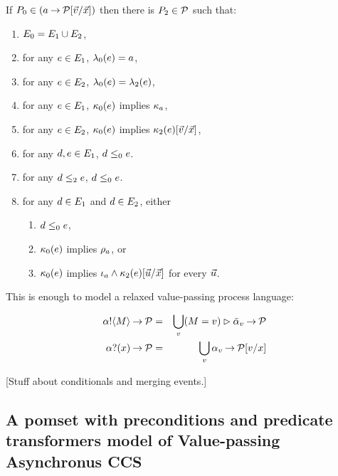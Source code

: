 \begin{definition}
  \label{defn:pomset-wprefix}
  If $P_0 \in (a\mathbin{\rightarrow}\mathcal{P}[\vec{v}/\vec{x}])$ then there is $P_2\in\mathcal{P}$ such that:
  \begin{enumerate}
  \item $E_0=E_1 \cup E_2$,
  \item for any $e\in E_1$, $\lambda_0(e) = a$,
  \item for any $e\in E_2$, $\lambda_0(e) = \lambda_2(e)$,
  \item for any $e\in E_1$, $\kappa_0(e)$ implies $\kappa_a$,
  \item for any $e\in E_2$, $\kappa_0(e)$ implies $\kappa_2(e)[\vec{v}/\vec{x}]$,
  \item for any $d,e\in E_1$, $d\le_0e$.
  \item for any $d\le_2e$, $d\le_0e$.
  \item for any $d\in E_1$ and $d\in E_2$, either
    \begin{enumerate}
    \item $d\le_0e$,
    \item $\kappa_0(e)$ implies $\rho_a$, or
    \item $\kappa_0(e)$ implies $\iota_a\land\kappa_2(e)[\vec{u}/\vec{x}]$ for every $\vec{u}$.
    \end{enumerate}
  \end{enumerate}
\end{definition}

This is enough to model a relaxed value-passing process language:

\begin{eqnarray*}
  \sSEND\aChan\aExp\wPREFIX\aPSS & = &
  \bigcup_\aVal (\aExp=\aVal) \sGUARD \send\aChan{\aVal} \wPREFIX \aPSS
\\
  \sRECV\aChan\aVar\wPREFIX\aPSS & = &
  \bigcup_\aVal \recv\aChan{\aVal} \wPREFIX \aPSS[\aVal/\aVar]
\end{eqnarray*}

[Stuff about conditionals and merging events.]

\subsection{A pomset with preconditions and predicate transformers model of Value-passing Asynchronus CCS}

